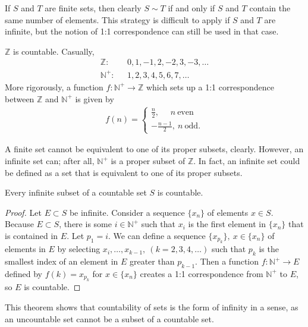 \documentclass[12pt]{article}
\begin{document}
\begin{comm}
  If $S$ and $T$ are finite sets, then clearly $S \sim T$ if and only if $S$ and $T$
  contain the same number of elements. This strategy is difficult to apply if $S$ and
  $T$ are infinite, but the notion of 1:1 correspondence can still be used in that
  case.
\end{comm}

\begin{exm}
  $\mathbb{Z}$ is countable. Casually,
  \begin{align*}
    \mathbb{Z}:&\ \ \ 0,1,-1,2,-2,3,-3,\ldots\\
    \mathbb{N}^+:&\ \ \ 1,2,3,4,5,6,7,\ldots
  \end{align*}
  More rigorously, a function $f: \mathbb{N}^+ \to \mathbb{Z}$ which sets up a 1:1
  correspondence between $\mathbb{Z}$ and $\mathbb{N}^+$ is given by
  \begin{align*}
    f(n) =
    \begin{cases}
      \frac{n}{2},\ \ \ \ \ \ n\ \text{even}\\
      -\frac{n-1}{2},\ n\ \text{odd}.
    \end{cases}
  \end{align*}
\end{exm}

\begin{comm}
  A finite set cannot be equivalent to one of its proper subsets, clearly. However,
  an infinite set can; after all, $\mathbb{N}^+$ is a proper subset of $\mathbb{Z}$.
  In fact, an infinite set could be defined as a set that is equivalent to one of its
  proper subsets.
\end{comm}

\begin{thm}
  Every infinite subset of a countable set $S$ is countable.

  \begin{proof}
    Let $E \subset S$ be infinite. Consider a sequence $\{x_n\}$ of elements $x \in
    S$. Because $E \subset S$, there is some $i \in \mathbb{N}^+$ such that $x_i$ is
    the first element in $\{x_n\}$ that is contained in $E$. Let $p_1 = i$. We can define a sequence
    $\{x_{p_k}\},\ x \in \{x_n\}$ of elements in $E$ by selecting $x_i,\ldots,x_{k-1},\
    (k = 2,3,4,\ldots)$ such that $p_k$ is the smallest index of an element in $E$
    greater than $p_{k-1}$. Then a function $f: \mathbb{N}^+ \to E$ defined by $f(k)
    = x_{p_k}$ for $x \in \{x_n\}$ creates a 1:1 correspondence from $\mathbb{N}^+$
    to $E$, so $E$ is countable.
  \end{proof}
\end{thm}

\begin{comm}
  This theorem shows that countability of sets is the  form of infinity
  in a sense, as an uncountable set cannot be a subset of a countable set.
\end{comm}
\end{document}
